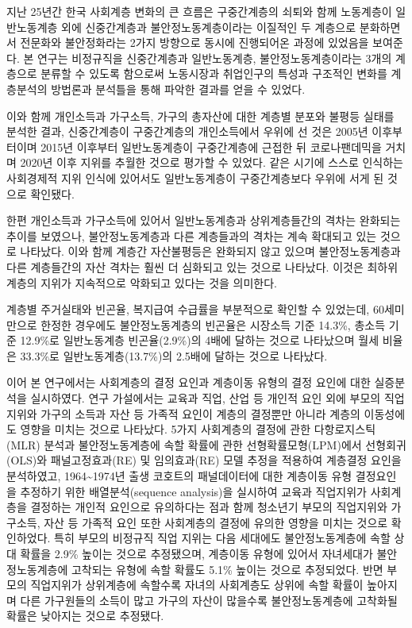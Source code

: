 \documentclass[
  letterpaper,
  DIV=11,
  numbers=noendperiod]{scrartcl}
\begin{document}
지난 25년간 한국 사회계층 변화의 큰 흐름은 구중간계층의 쇠퇴와 함께
노동계층이 일반노동계층 외에 신중간계층과 불안정노동계층이라는 이질적인
두 계층으로 분화하면서 전문화와 불안정화라는 2가지 방향으로 동시에
진행되어온 과정에 있었음을 보여준다. 본 연구는 비정규직을 신중간계층과
일반노동계층, 불안정노동계층이라는 3개의 계층으로 분류할 수 있도록
함으로써 노동시장과 취업인구의 특성과 구조적인 변화를 계층분석의
방법론과 분석틀을 통해 파악한 결과를 얻을 수 있었다.

이와 함께 개인소득과 가구소득, 가구의 총자산에 대한 계층별 분포와 불평등
실태를 분석한 결과, 신중간계층이 구중간계층의 개인소득에서 우위에 선
것은 2005년 이후부터이며 2015년 이후부터 일반노동계층이 구중간계층에
근접한 뒤 코로나팬데믹을 거치며 2020년 이후 지위를 추월한 것으로 평가할
수 있었다. 같은 시기에 스스로 인식하는 사회경제적 지위 인식에 있어서도
일반노동계층이 구중간계층보다 우위에 서게 된 것으로 확인됐다.

한편 개인소득과 가구소득에 있어서 일반노동계층과 상위계층들간의 격차는
완화되는 추이를 보였으나, 불안정노동계층과 다른 계층들과의 격차는 계속
확대되고 있는 것으로 나타났다. 이와 함께 계층간 자산불평등은 완화되지
않고 있으며 불안정노동계층과 다른 계층들간의 자산 격차는 훨씬 더
심화되고 있는 것으로 나타났다. 이것은 최하위계층의 지위가 지속적으로
악화되고 있다는 것을 의미한다.

계층별 주거실태와 빈곤율, 복지급여 수급률을 부분적으로 확인할 수
있었는데, 60세미만으로 한정한 경우에도 불안정노동계층의 빈곤율은
시장소득 기준 14.3\%, 총소득 기준 12.9\%로 일반노동계층 빈곤율(2.9\%)의
4배에 달하는 것으로 나타났으며 월세 비율은 33.3\%로
일반노동계층(13.7\%)의 2.5배에 달하는 것으로 나타났다.

이어 본 연구에서는 사회계층의 결정 요인과 계층이동 유형의 결정 요인에
대한 실증분석을 실시하였다. 연구 가설에서는 교육과 직업, 산업 등 개인적
요인 외에 부모의 직업지위와 가구의 소득과 자산 등 가족적 요인이 계층의
결정뿐만 아니라 계층의 이동성에도 영향을 미치는 것으로 나타났다. 5가지
사회계층의 결정에 관한 다항로지스틱(MLR) 분석과 불안정노동계층에 속할
확률에 관한 선형확률모형(LPM)에서 선형회귀(OLS)와 패널고정효과(RE) 및
임의효과(RE) 모델 추정을 적용하여 계층결정 요인을 분석하였고,
1964\textasciitilde1974년 출생 코호트의 패널데이터에 대한 계층이동 유형
결정요인을 추정하기 위한 배열분석(sequence analysis)을 실시하여 교육과
직업지위가 사회계층을 결정하는 개인적 요인으로 유의하다는 점과 함께
청소년기 부모의 직업지위와 가구소득, 자산 등 가족적 요인 또한 사회계층의
결정에 유의한 영향을 미치는 것으로 확인하었다. 특히 부모의 비정규직 직업
지위는 다음 세대에도 불안정노동계층에 속할 상대 확률을 2.9\% 높이는
것으로 추정됐으며, 계층이동 유형에 있어서 자녀세대가 불안정노동계층에
고착되는 유형에 속할 확률도 5.1\% 높이는 것으로 추정되었다. 반면 부모의
직업지위가 상위계층에 속할수록 자녀의 사회계층도 상위에 속할 확률이
높아지며 다른 가구원들의 소득이 많고 가구의 자산이 많을수록
불안정노동계층에 고착화될 확률은 낮아지는 것으로 추정됐다.
\end{document}
